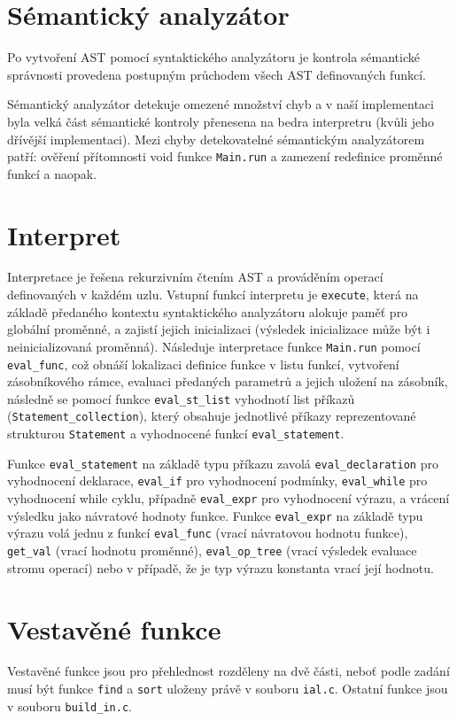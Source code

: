 \documentclass[a4paper,11pt]{article}
\begin{document}
\section{Sémantický analyzátor}
Po vytvoření AST pomocí syntaktického analyzátoru je kontrola sémantické správnosti provedena postupným průchodem všech AST definovaných funkcí.

Sémantický analyzátor detekuje omezené množství chyb a v naší implementaci byla velká část sémantické kontroly přenesena na bedra interpretru (kvůli jeho dřívější implementaci). Mezi chyby detekovatelné sémantickým analyzátorem patří: ověření přítomnosti void funkce \texttt{Main.run} a zamezení redefinice proměnné funkcí a naopak.

\section{Interpret}

Interpretace je řešena rekurzivním čtením AST a prováděním operací definovaných v každém uzlu. Vstupní funkcí interpretu je \texttt{execute}, která na základě předaného kontextu syntaktického analyzátoru alokuje paměť pro globální proměnné, a zajistí jejich inicializaci (výsledek inicializace může být i neinicializovaná proměnná).
Následuje interpretace funkce \texttt{Main.run} pomocí \texttt{eval\_func}, což obnáší lokalizaci definice funkce v listu funkcí, vytvoření zásobníkového rámce, evaluaci předaných parametrů a jejich uložení na zásobník, následně se pomocí funkce \texttt{eval\_st\_list} vyhodnotí list příkazů (\texttt{Statement\_collection}), který obsahuje jednotlivé příkazy reprezentované strukturou \texttt{Statement} a vyhodnocené funkcí \texttt{eval\_statement}.

Funkce \texttt{eval\_statement} na základě typu příkazu zavolá \texttt{eval\_declaration} pro vyhodnocení deklarace, \texttt{eval\_if} pro vyhodnocení podmínky, \texttt{eval\_while} pro vyhodnocení while cyklu, případně \texttt{eval\_expr} pro vyhodnocení výrazu, a vrácení výsledku jako návratové hodnoty funkce.
Funkce \texttt{eval\_expr} na základě typu výrazu volá jednu z funkcí \texttt{eval\_func} (vrací návratovou hodnotu funkce), \texttt{get\_val} (vrací hodnotu proměnné), \texttt{eval\_op\_tree} (vrací výsledek evaluace stromu operací) nebo v případě, že je typ výrazu konstanta vrací její hodnotu.


\section{Vestavěné funkce}
Vestavěné funkce jsou pro přehlednost rozděleny na dvě části, neboť podle zadání musí být funkce \texttt{find} a \texttt{sort} uloženy právě v souboru \texttt{ial.c}. Ostatní funkce jsou v souboru \texttt{build\_in.c}.
\end{document}
